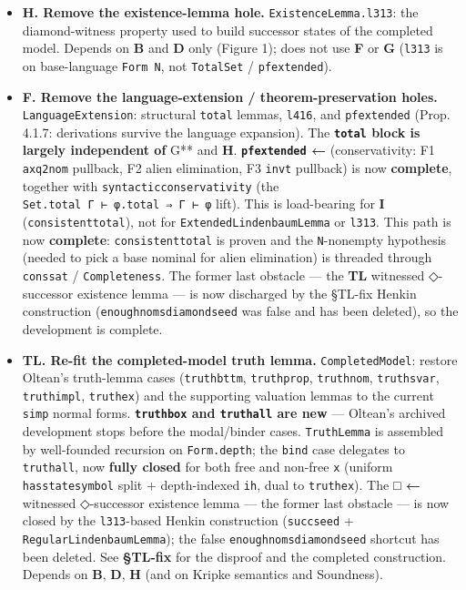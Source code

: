 \documentclass[11pt,a4paper]{article}
\renewcommand{\_}{\origtextunderscore\allowbreak}
\begin{document}
\begin{itemize}
\item
  \textbf{H. Remove the existence-lemma hole.} \texttt{ExistenceLemma.l313\textquotesingle{}}: the diamond-witness property used to build successor states of the completed model. Depends on \textbf{B} and \textbf{D} only (Figure 1); does not use \textbf{F} or \textbf{G} (\texttt{l313\textquotesingle{}} is on base-language \texttt{Form\ N}, not \texttt{TotalSet} / \texttt{pf\_extended}).
\item
  \textbf{F. Remove the language-extension / theorem-preservation holes.} \texttt{LanguageExtension}: structural \texttt{total\_*} lemmas, \texttt{l416}, and \texttt{pf\_extended} (Prop. 4.1.7: derivations survive the language expansion). The \textbf{\texttt{total\_*} block is largely independent of }G** and \textbf{H}. \textbf{\texttt{pf\_extended} ←} (conservativity: F1 \texttt{ax\_q2\_nom} pullback, F2 alien elimination, F3 \texttt{inv\_t} pullback) is now \textbf{complete}, together with \texttt{syntactic\_conservativity} (the \texttt{Set.total\ Γ\ ⊢\ φ.total\ ⇒\ Γ\ ⊢\ φ} lift). This is load-bearing for \textbf{I} (\texttt{consistent\_total}), not for \texttt{ExtendedLindenbaumLemma} or \texttt{l313\textquotesingle{}}. This path is now \textbf{complete}: \texttt{consistent\_total} is proven and the \texttt{N}-nonempty hypothesis (needed to pick a base nominal for alien elimination) is threaded through \texttt{cons\_sat} / \texttt{Completeness}. The former last obstacle --- the \textbf{TL} witnessed ◇-successor existence lemma --- is now discharged by the §TL-fix Henkin construction (\texttt{enough\_noms\_diamond\_seed} was false and has been deleted), so the development is complete.
\item
  \textbf{TL. Re-fit the completed-model truth lemma.} \texttt{CompletedModel}: restore Oltean's truth-lemma cases (\texttt{truth\_bttm}, \texttt{truth\_prop}, \texttt{truth\_nom}, \texttt{truth\_svar}, \texttt{truth\_impl}, \texttt{truth\_ex}) and the supporting valuation lemmas to the current \texttt{simp} normal forms. \textbf{\texttt{truth\_box} and \texttt{truth\_all} are new} --- Oltean's archived development stops before the modal/binder cases. \texttt{TruthLemma} is assembled by well-founded recursion on \texttt{Form.depth}; the \texttt{bind} case delegates to \texttt{truth\_all}, now \textbf{fully closed} for both free and non-free \texttt{x} (uniform \texttt{has\_state\_symbol} split + depth-indexed \texttt{ih}, dual to \texttt{truth\_ex}). The \textbf{□ ←} witnessed ◇-successor existence lemma --- the former last obstacle --- is now closed by the \texttt{l313\textquotesingle{}}-based Henkin construction (\texttt{succ\_seed} + \texttt{RegularLindenbaumLemma}); the false \texttt{enough\_noms\_diamond\_seed} shortcut has been deleted. See \textbf{§TL-fix} for the disproof and the completed construction. Depends on \textbf{B}, \textbf{D}, \textbf{H} (and on Kripke semantics and Soundness).

\end{itemize}
\end{document}
